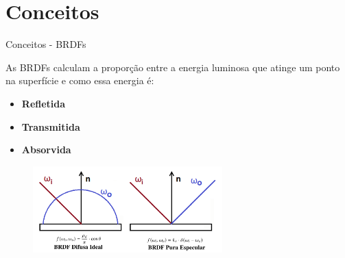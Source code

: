 
\section{Conceitos}

\begin{frame}{Conceitos - BRDFs}

As BRDFs calculam a proporção entre a energia luminosa que atinge um ponto na superfície e como essa energia é:
    \begin{itemize}
        \item \textbf{Refletida}
        \item \textbf{Transmitida}
        \item \textbf{Absorvida}
    \end{itemize}
    \begin{figure}[H]
        \begin{center}
            \includegraphics[width=0.65\textwidth]{./Imagens/difusa-e-specular.png}
        \end{center}
    \end{figure}
\end{frame}


